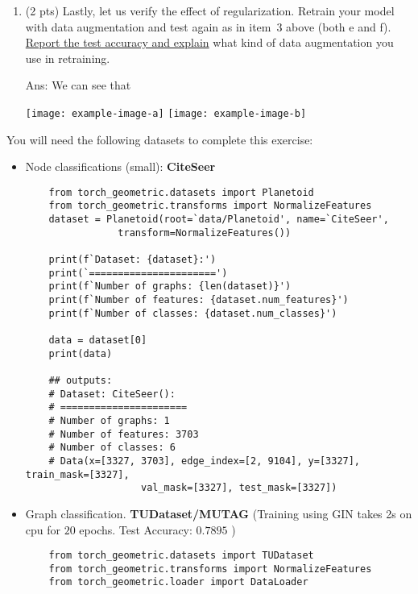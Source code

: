 \documentclass[10pt]{article}
\newcommand{\ans}[1]{{\color{blue}\textsf{Ans}: #1}}
\begin{document}
\begin{exercise}
\begin{enumerate}
			\item (2 pts) Lastly, let us verify the effect of regularization. Retrain your model with data augmentation and test again as in item~3 above (both e and f). \uline{Report the test accuracy and explain} what kind of data augmentation you use in retraining.
			
				\ans{We can see that
				\begin{center}
				\texttt{[image: example-image-a]}	\texttt{[image: example-image-b]}
				\end{center}
				}		
		\end{enumerate}
	\end{exercise}

	\begin{exercise}
	You will need the following datasets to complete this exercise:
	\begin{itemize}
        \item Node classifications (small): \textbf{CiteSeer} 
            \begin{verbatim}
    from torch_geometric.datasets import Planetoid
    from torch_geometric.transforms import NormalizeFeatures
    dataset = Planetoid(root=`data/Planetoid', name=`CiteSeer', 
                transform=NormalizeFeatures())
            
    print(f`Dataset: {dataset}:')
    print(`======================')
    print(f`Number of graphs: {len(dataset)}')
    print(f`Number of features: {dataset.num_features}')
    print(f`Number of classes: {dataset.num_classes}')
            
    data = dataset[0]
    print(data)
            
    ## outputs:
    # Dataset: CiteSeer():
    # ======================
    # Number of graphs: 1
    # Number of features: 3703
    # Number of classes: 6
    # Data(x=[3327, 3703], edge_index=[2, 9104], y=[3327], train_mask=[3327], 
                    val_mask=[3327], test_mask=[3327])
            \end{verbatim}
        
        \item Graph classification. \textbf{TUDataset/MUTAG} (Training using GIN takes 2s on cpu for $20$ epochs. Test Accuracy: $0.7895$ )
            \begin{verbatim}
    from torch_geometric.datasets import TUDataset
    from torch_geometric.transforms import NormalizeFeatures
    from torch_geometric.loader import DataLoader


\end{verbatim}
\end{itemize}
\end{exercise}
\end{document}
